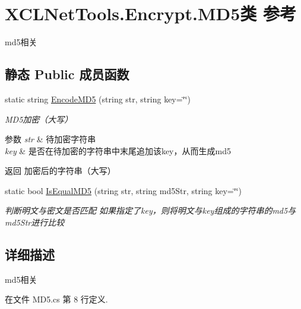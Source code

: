 \hypertarget{class_x_c_l_net_tools_1_1_encrypt_1_1_m_d5}{\section{X\-C\-L\-Net\-Tools.\-Encrypt.\-M\-D5类 参考}
\label{class_x_c_l_net_tools_1_1_encrypt_1_1_m_d5}
}


md5相关  


\subsection*{静态 Public 成员函数}
\begin{DoxyCompactItemize}
\item 
static string \hyperlink{class_x_c_l_net_tools_1_1_encrypt_1_1_m_d5_a146cf118c47e0693f82119d39f4b7ef1}{Encode\-M\-D5} (string str, string key=\char`\"{}\char`\"{})
\begin{DoxyCompactList}\small\item\em M\-D5加密（大写） 
\begin{DoxyParams}{参数}
{\em str} & 待加密字符串\\
\hline
{\em key} & 是否在待加密的字符串中末尾追加该key，从而生成md5\\
\hline
\end{DoxyParams}
\begin{DoxyReturn}{返回}
加密后的字符串（大写）
\end{DoxyReturn}
\end{DoxyCompactList}\item 
static bool \hyperlink{class_x_c_l_net_tools_1_1_encrypt_1_1_m_d5_a47f3bda0226d74bd2c9823a023ed8ed5}{Is\-Equal\-M\-D5} (string str, string md5\-Str, string key=\char`\"{}\char`\"{})
\begin{DoxyCompactList}\small\item\em 判断明文与密文是否匹配 如果指定了key，则将明文与key组成的字符串的md5与md5\-Str进行比较 \end{DoxyCompactList}\end{DoxyCompactItemize}


\subsection{详细描述}
md5相关 



在文件 M\-D5.\-cs 第 8 行定义.



